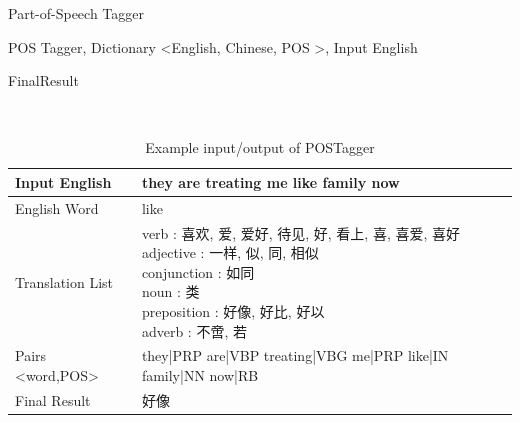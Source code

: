 \begin{algorithm}[ht]
\caption{Part-of-Speech Tagger}
\label{algorithm:wsd_1}
\begin{algorithmic}
\REQUIRE POS Tagger, Dictionary \textless English, Chinese, POS \textgreater, Input English


        \ENDIF
    \ENDFOR
        \ENDIF
    \ENDFOR
\ENDIF
\RETURN FinalResult
\end{algorithmic}
\end{algorithm}
\\
\begin{table}[ht]
    \caption{Example input/output of POSTagger}
    \label{table:part_of_speech_example}
    \begin{center}
    \begin{tabular}{| p{2.5cm} | p{4cm} |}
        \hline
        Input English & they are treating me like family now\\
        \hline
        English Word & like \\
        \hline
        Translation List & \parbox[t]{4cm}{verb : 喜欢, 爱, 爱好, 待见, 好, 看上, 喜, 喜爱, 喜好\\ adjective : 一样, 似, 同, 相似\\ conjunction : 如同\\noun : 类\\preposition : 好像, 好比, 好以\\adverb : 不啻, 若}\\
        \hline
        Pairs \textless word,POS\textgreater & they|PRP are|VBP treating|VBG me|PRP like|IN family|NN now|RB\\
        \hline
        Final Result & 好像\\
        \hline
    \end{tabular}
    \end{center}
\end{table}


